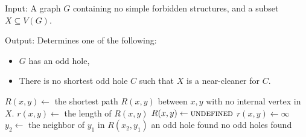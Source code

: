 \begin{alg}
	\label{alg:testNearCleaner}
	Input: A graph $G$ containing no simple forbidden structures, and a subset $X \subseteq V(G)$.

	\noindent Output: Determines one of the following:
	\begin{itemize}
		\item $G$ has an odd hole,
		\item There is no shortest odd hole $C$ such that $X$ is a near-cleaner for $C$.
	\end{itemize}
\end{alg}

\begin{algorithmic}[1]
				\ls $R(x, y) \gets$ the shortest path $R(x, y)$ between $x, y$ with no
				\lsx internal vertex in $X$.
				\ls $r(x, y) \gets$ the length of $R(x, y)$
			\mElse
				\ls $R(x, y) \gets \textsc{undefined}$
				\ls $r(x, y) \gets \infty$
			\mEndIf
			 \label{line:cudaStart}
				 \label{line:3vertex}
					 \label{line:cudaWorkStard}
						\ls $y_2 \gets$ the neighbor of $y_1$ in $R(x_2, y_1)$ \label{line:definey2}
						\ls \RETURN an odd hole found
						\mEndIf
					\mEndIf \label{line:cudaWorkEnd}
				\mEndFor
			\mEndFor \label{line:cudaEnd}
		\mEndFor
		\ls \RETURN no odd holes found
	\mEndProcedure
\end{algorithmic}

